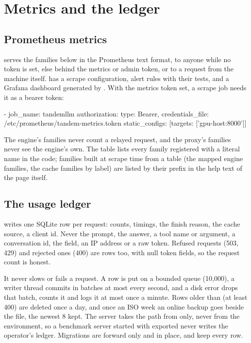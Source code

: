 \chapter{Metrics and the ledger}\label{ch:ref-metrics}

\section{Prometheus metrics}

 serves the families below in the Prometheus text format, to anyone while no token is set, else behind the metrics or admin token, or to a request from the machine itself.  has a scrape configuration, alert rules with their tests, and a Grafana dashboard generated by . With the metrics token set, a scrape job needs it as a bearer token:

\begin{plain}
- job_name: tandemllm
  authorization: {type: Bearer, credentials_file: /etc/prometheus/tandem-metrics.token}
  static_configs: [{targets: ['gpu-host:8000']}]
\end{plain}

The engine's families never count a relayed request, and the proxy's families never see the engine's own. The table lists every family registered with a literal name in the code; families built at scrape time from a table (the mapped  engine families, the cache families by  label) are listed by their prefix in the help text of the page itself.



\section{The usage ledger}\label{sec:ledger}

 writes one SQLite row per request: counts, timings, the finish reason, the cache source, a client id. Never the prompt, the answer, a tool name or argument, a conversation id, the  field, an IP address or a raw token. Refused requests (503, 429) and rejected ones (400) are rows too, with null token fields, so the request count is honest.

It never slows or fails a request. A row is put on a bounded queue (10,000), a writer thread commits in batches at most every second, and a disk error drops that batch, counts it and logs it at most once a minute. Rows older than  (at least 400) are deleted once a day, and once an ISO week an online backup goes beside the file, the newest 8 kept. The server takes the path from  only, never from the environment, so a benchmark server started with  exported never writes the operator's ledger. Migrations are forward only and in place, and keep every row.

